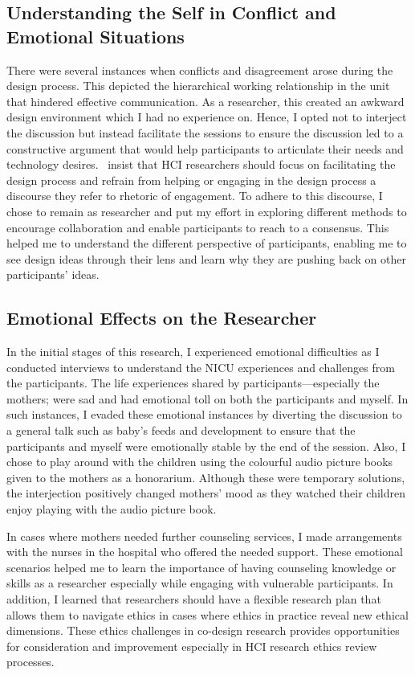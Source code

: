 \subsection{Understanding the Self in Conflict and Emotional Situations}
There were several instances when conflicts and disagreement arose during the design process. This depicted the hierarchical working relationship in the unit that hindered effective communication. As a researcher, this created an awkward design environment which I had no experience on. Hence, I opted not to interject the discussion but instead facilitate the sessions to ensure the discussion led to a constructive argument that would help participants to articulate their needs and technology desires.~\textcite{Rogers2013} insist that HCI researchers should focus on facilitating the design process and refrain from helping or engaging in the design process a discourse they refer to rhetoric of engagement. To adhere to this discourse, I chose to remain as researcher and put my effort in exploring different methods to encourage collaboration and enable participants to reach to a consensus. This helped me to understand the different perspective of participants, enabling me to see design ideas through their lens and learn why they are pushing back on other participants' ideas. 

\subsection{Emotional Effects on the Researcher} 
In the initial stages of this research, I experienced emotional difficulties as I conducted interviews to understand the NICU experiences and challenges  from the participants. The life experiences shared by participants---especially the mothers; were sad and had emotional toll on both the participants and myself. In such instances,  I evaded these emotional instances by diverting the discussion to a general talk such as baby's feeds and development to ensure that the participants and myself were emotionally stable by the end of the session. Also, I chose to play around with the children using the colourful audio picture books given to the mothers as a honorarium. Although these were temporary solutions, the interjection positively changed mothers' mood as they watched their children enjoy playing with the audio picture book. 

In cases where mothers needed further counseling services, I made arrangements with the nurses in the hospital who offered the needed support.  These emotional scenarios helped me to learn the importance of having counseling knowledge or skills as a researcher especially while engaging with vulnerable participants. In addition, I learned that researchers should have a flexible research plan that allows them to navigate ethics in cases where ethics in practice reveal new ethical dimensions. These ethics challenges in co-design research provides opportunities for consideration and improvement especially in HCI research ethics review processes.

